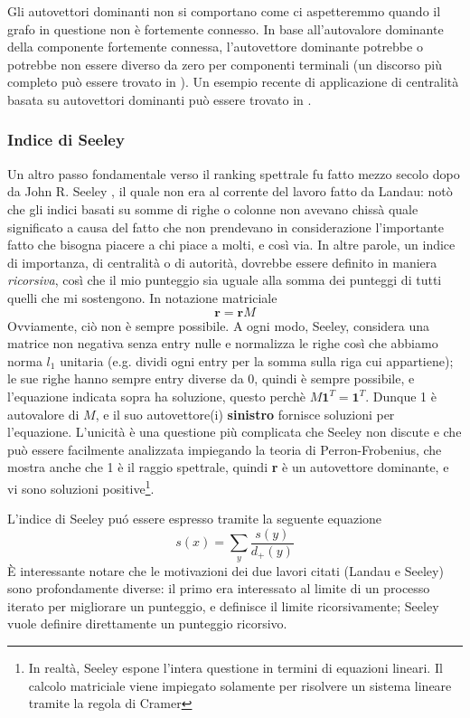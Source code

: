 Gli autovettori dominanti non si comportano come ci aspetteremmo quando il grafo in questione non è fortemente connesso. In base all'autovalore dominante della componente fortemente connessa, l'autovettore dominante potrebbe o potrebbe non essere diverso da zero per componenti terminali (un discorso più completo può essere trovato in \cite{autovalori}).
Un esempio recente di applicazione di centralità basata su autovettori dominanti può essere trovato in \cite{calcio}.
\subsubsection{Indice di Seeley}
Un altro passo fondamentale verso il ranking spettrale fu fatto mezzo secolo dopo da John R. Seeley \cite{seeley}
, il quale non era al corrente del lavoro fatto da Landau: notò che gli indici basati su somme di righe o colonne non avevano chissà quale significato a causa del fatto che non prendevano in considerazione l'importante fatto che bisogna piacere a chi piace a molti, e così via. In altre parole, un indice di importanza, di centralità o di autorità, dovrebbe essere definito in maniera \textit{ricorsiva}, così che il mio punteggio sia uguale alla somma dei punteggi di tutti quelli che mi sostengono. In notazione matriciale
\begin{equation*}
    \textbf{r} = \textbf{r}M
\end{equation*}
Ovviamente, ciò non è sempre possibile. A ogni modo, Seeley, considera una matrice non negativa senza entry nulle e normalizza le righe così che abbiamo norma $l_1$ unitaria (e.g. dividi ogni entry per la somma sulla riga cui appartiene); le sue righe hanno sempre entry diverse da 0, quindi è sempre possibile, e l'equazione indicata sopra ha soluzione, questo perchè $M\textbf{1}^T = \textbf{1}^T$. Dunque 1 è autovalore di $M$, e il suo autovettore(i) \textbf{sinistro} fornisce soluzioni per l'equazione. L'unicità è una questione più complicata che Seeley non discute e che può essere facilmente analizzata impiegando la teoria di Perron-Frobenius, che mostra anche che 1 è il raggio spettrale, quindi \textbf{r} è  un autovettore dominante, e vi sono soluzioni positive\footnote{In realtà, Seeley espone l'intera questione in termini di equazioni lineari. Il calcolo matriciale viene impiegato solamente per risolvere un sistema lineare tramite la regola di Cramer}.

L'indice di Seeley puó essere espresso tramite la seguente equazione
\begin{equation}
    s(x) = \sum_y{\frac{s(y)}{d_+(y)}}
\end{equation}
È interessante notare che le motivazioni dei due lavori citati (Landau e Seeley) sono profondamente diverse: il primo era interessato al limite di un processo iterato per migliorare un punteggio, e definisce il limite ricorsivamente; Seeley vuole definire direttamente un punteggio ricorsivo.

